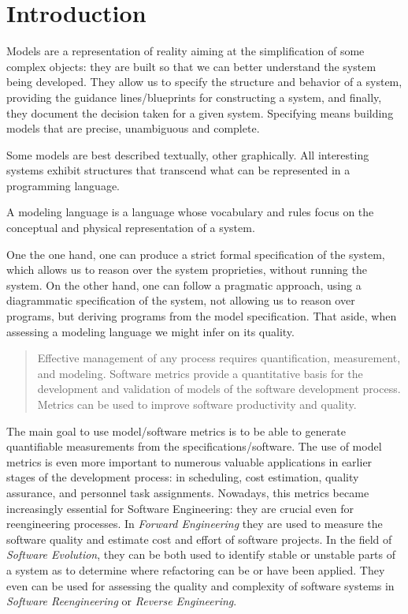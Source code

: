 \section{Introduction}

Models are a representation of reality aiming at the simplification of some complex objects: they are built so that we can better understand the system being developed.
They allow us to specify the structure and behavior of a system, providing the guidance lines/blueprints for constructing a system, and finally, they document the decision taken for a given system.
Specifying means building models that are precise, unambiguous and complete. 

Some models are best described textually, other graphically. All interesting systems exhibit structures that transcend what can be represented in a programming language.

A modeling language is a language whose vocabulary and rules focus on the conceptual and physical representation of a system.%


\par One the one hand, one can produce a strict formal specification of the system, which allows us to reason over the system proprieties, without running the system.
On the other hand, one can follow a pragmatic approach, using a diagrammatic specification of the system, not allowing us to reason over programs,
but deriving programs from the model specification. That aside, when assessing a modeling language we might infer on its quality.

\begin{quotation}
Effective management of any process requires quantification, measurement, and modeling.
Software metrics provide a quantitative basis for the development and validation of models of the software development process.
Metrics can be used to improve software productivity and quality\cite{g1:Millis:1998}.
\end{quotation}

The main goal to use model/software metrics is to be able to generate quantifiable measurements from the specifications/software. The use of model metrics is even more
important to numerous valuable applications in earlier stages of the development process: in scheduling, cost estimation, quality assurance, and personnel task assignments.
Nowadays, this metrics became increasingly essential for Software Engineering: they are crucial even for reengineering processes.
In \emph{Forward Engineering} they are used to measure the software quality and estimate cost and effort of software projects\cite{Fenton}.
In the field of \emph{Software Evolution}, they can be both used to identify stable or unstable parts of a system as to determine where refactoring can be or have been applied\cite{Serge}.
They even can be used for assessing the quality and complexity of software systems in \emph{Software Reengineering} or \emph{Reverse Engineering}\cite{43044}.

